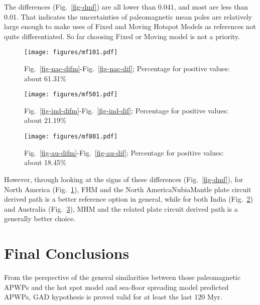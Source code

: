 The differences (Fig.~\ref{fig-dmf}) are all lower than 0.041, and most are less
than 0.01. That indicates the uncertainties of paleomagnetic mean poles are
relatively large enough to make uses of Fixed and Moving Hotspot Models as
references not quite differentiated. So far choosing Fixed or Moving model is
not a priority.

\begin{figure*}
	\centering
	\begin{subfigure}{1.01\textwidth}
		\texttt{[image: figures/mf101.pdf]}
		\caption{Fig.~\ref{fig-nac-difm}-Fig.~\ref{fig-nac-dif}; Percentage for
		positive values: about 61.31\%}\label{fig-mf101}
	\end{subfigure}
	\vspace{.1em}
	\begin{subfigure}{1.01\textwidth}
		\texttt{[image: figures/mf501.pdf]}
		\caption{Fig.~\ref{fig-ind-difm}-Fig.~\ref{fig-ind-dif}; Percentage for
		positive values: about 21.19\%}\label{fig-mf501}
	\end{subfigure}
	\vspace{.1em}
	\begin{subfigure}{1.01\textwidth}
		\texttt{[image: figures/mf801.pdf]}
		\caption{Fig.~\ref{fig-au-difm}-Fig.~\ref{fig-au-dif}; Percentage for
		positive values: about 18.45\%}\label{fig-mf801}
	\end{subfigure}
	\caption[Differences between results from FHM and MHM]{Differences between
	results from FHM (Fig.~\ref{fig-dif}) and MHM (Fig.~\ref{fig-difm}) as
	reference paths.}\label{fig-dmf}
\end{figure*}

However, through looking at the signs of these differences
(Fig.~\ref{fig-dmf}), for North America (Fig.~\ref{fig-mf101}), FHM and the
North America\textendash{}Nubia\textendash{}Mantle plate circuit derived
path is a better reference option in general, while for both India
(Fig.~\ref{fig-mf501}) and Australia (Fig.~\ref{fig-mf801}), MHM and the related
plate circuit derived path is a generally better choice.


\section{Final Conclusions}

From the perspective of the general similarities between those paleomagnetic
APWPs and the hot spot model and sea-floor spreading model predicted APWPs, GAD
hypothesis is proved valid for at least the last 120 Myr.

